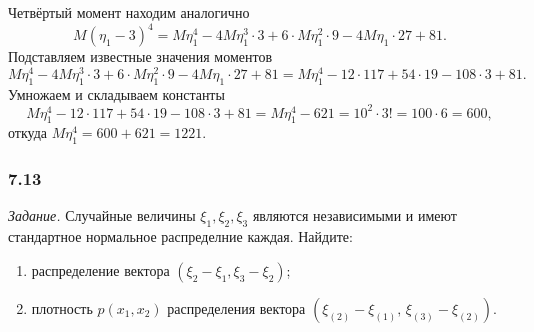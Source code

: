 \begin{enumerate}[label=\alph*)]
  Четвёртый момент находим аналогично
  $$M \left( \eta_1 - 3 \right)^4 =
    M \eta_1^4 - 4M \eta_1^3 \cdot 3 + 6 \cdot M \eta_1^2 \cdot 9 - 4M \eta_1 \cdot 27 + 81.$$
  Подставляем известные значения моментов
  $$M \eta_1^4 - 4M \eta_1^3 \cdot 3 + 6 \cdot M \eta_1^2 \cdot 9 - 4M \eta_1 \cdot 27 + 81 =
    M \eta_1^4 - 12 \cdot 117 + 54 \cdot 19 - 108 \cdot 3 + 81.$$
  Умножаем и складываем константы
  $$M \eta_1^4 - 12 \cdot 117 + 54 \cdot 19 - 108 \cdot 3 + 81 =
    M \eta_1^4 - 621 =
    10^2 \cdot 3! =
    100 \cdot 6 =
    600,$$
  откуда $M \eta_1^4 = 600 + 621 = 1221$.
\end{enumerate}

\subsubsection*{7.13}

\textit{Задание.}
Случайные величины $ \xi_1, \xi_2, \xi_3$
являются независимыми и имеют стандартное нормальное распределние каждая.
Найдите:
\begin{enumerate}[label=\alph*)]
  \item распределение вектора $ \left( \xi_2 - \xi_1, \xi_3 - \xi_2 \right) $;
  \item плотность $p \left( x_1, x_2 \right) $ распределения вектора
  $ \left( \xi_{ \left( 2 \right) } - \xi_{ \left( 1 \right) }, \,
    \xi_{ \left( 3 \right) } - \xi_{ \left( 2 \right) } \right) $.
\end{enumerate}


